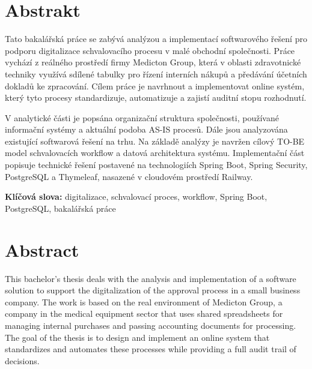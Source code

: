 \documentclass[
  a4paper,          %
  11pt,             %
  oneside,          %
  openany           %
]{report}
\begin{document}
\chapter*{Abstrakt}
\thispagestyle{plain}

Tato bakalářská práce se zabývá analýzou a implementací softwarového řešení pro podporu
digitalizace schvalovacího procesu v malé obchodní společnosti. Práce vychází z reálného
prostředí firmy Medicton Group, která v oblasti zdravotnické techniky využívá sdílené tabulky
pro řízení interních nákupů a předávání účetních dokladů ke zpracování. Cílem práce je
navrhnout a implementovat online systém, který tyto procesy standardizuje, automatizuje
a zajistí auditní stopu rozhodnutí.

V analytické části je popsána organizační struktura společnosti, používané informační systémy
a aktuální podoba AS-IS procesů. Dále jsou analyzována existující softwarová řešení na trhu.
Na základě analýzy je navržen cílový TO-BE model schvalovacích workflow a datová architektura
systému. Implementační část popisuje technické řešení postavené na technologiích Spring Boot,
Spring Security, PostgreSQL a Thymeleaf, nasazené v cloudovém prostředí Railway.

\vspace{0.5cm}
\noindent\textbf{Klíčová slova:} digitalizace, schvalovací proces, workflow, Spring Boot,
PostgreSQL, bakalářská práce

\cleardoublepage

\chapter*{Abstract}
\thispagestyle{plain}

This bachelor's thesis deals with the analysis and implementation of a software solution
to support the digitalization of the approval process in a small business company.
The work is based on the real environment of Medicton Group, a company in the medical
equipment sector that uses shared spreadsheets for managing internal purchases and
passing accounting documents for processing. The goal of the thesis is to design and
implement an online system that standardizes and automates these processes while providing
a full audit trail of decisions.
\end{document}
